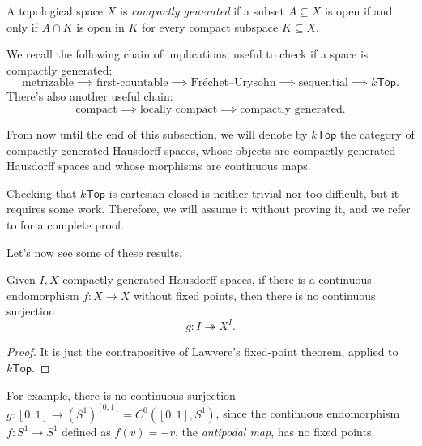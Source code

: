 \begin{definition}
    A topological space $X$ is \emph{compactly generated} if a subset $A \subseteq X$ is open if and only if $A \cap K$ is open in $K$ for every compact subspace $K \subseteq X$.
\end{definition}

\begin{remark}
    We recall the following chain of implications, useful to check if a space is compactly generated:
    \[ \textrm{metrizable} \implies \textrm{first-countable} \implies \textrm{Fréchet--Urysohn}\implies \textrm{sequential} \implies k\mathsf{Top}. \]
    There's also another useful chain:
    \[ \textrm{compact} \implies \textrm{locally compact} \implies \textrm{compactly generated}. \]
\end{remark}

\begin{notation}
    From now until the end of this subsection, we will denote by $k\mathsf{Top}$ the category of compactly generated Hausdorff spaces, whose objects are compactly generated Hausdorff spaces and whose morphisms are continuous maps.\label{idx:compactly-generated}
\end{notation}

\begin{remark}
    Checking that $k\mathsf{Top}$ is cartesian closed is neither trivial nor too difficult, but it requires some work. Therefore, we will assume it without proving it, and we refer to \Cite{Rezk2018} for a complete proof.
\end{remark}

Let's now see some of these results.

\begin{proposition}
    Given $I, X$ compactly generated Hausdorff spaces, if there is a continuous endomorphism $f : X \to X$ without fixed points, then there is no continuous surjection
    \[ g : I \twoheadrightarrow X^I. \]
\end{proposition}

\begin{proof}
    It is just the contrapositive of Lawvere's fixed-point theorem, applied to $k\mathsf{Top}$.
\end{proof}

\begin{example}
    For example, there is no continuous surjection $g : [0,1] \to (S^1)^{[0,1]} = C^0([0,1],S^1)$, since the continuous endomorphism $f : S^1 \to S^1$ defined as $f(v) = -v$, the \emph{antipodal map}, has no fixed points.
\end{example}

